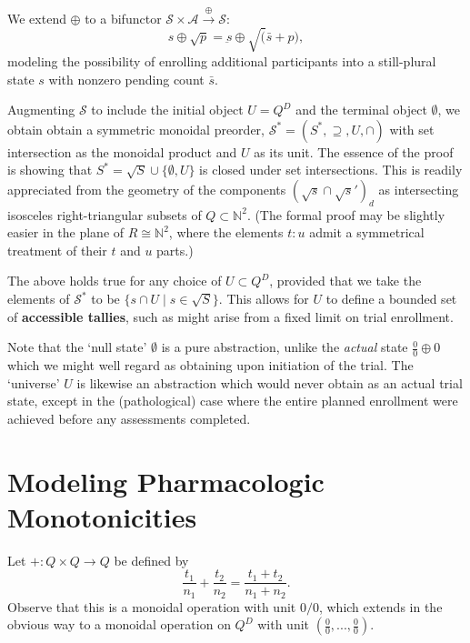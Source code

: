 \documentclass{article}
\newcommand{\N}{\mathbb{N}}
\begin{document}
\begin{nota}
  We extend $\oplus$ to a bifunctor $\mathcal{S} \times \mathcal{A} \xrightarrow{\oplus} \mathcal{S}$:
  $$
  s \oplus \surd p = \underbar{s} \oplus \surd ( \bar{s} + p ),
  $$
  modeling the possibility of enrolling additional participants into a still-plural state $s$ with nonzero pending count $\bar{s}$.
\end{nota}

\begin{fact}
  Augmenting $\mathcal{S}$ to include the initial object $U = Q^D$ and the terminal object $\emptyset$, we obtain obtain a symmetric monoidal preorder, $\mathcal{S}^* = (S^*,\supseteq,U,\cap)$ with set intersection as the monoidal product and $U$ as its unit.  The essence of the proof is showing that $S^* = \surd S \cup \{\emptyset,U\}$ is closed under set intersections.  This is readily appreciated from the geometry of the components $(\surd s \cap \surd s')_d$ as intersecting isosceles right-triangular subsets of $Q \subset \N^2$.  (The formal proof may be slightly easier in the plane of $R \cong \N^2$, where the elements $t\!:\!u$ admit a symmetrical treatment of their $t$ and $u$ parts.)
\end{fact}

\begin{fact}
  The above holds true for any choice of $U \subset Q^D$, provided that we take the elements of $\mathcal{S}^*$ to be $\{s \cap U \mid s \in \surd S\}$.  This allows for $U$ to define a bounded set of \textbf{accessible tallies}, such as might arise from a fixed limit on trial enrollment.
\end{fact}

Note that the `null state' $\emptyset$ is a pure abstraction, unlike the {\em actual} state $\frac{0}{0} \oplus 0$ which we might well regard as obtaining upon initiation of the trial.  The `universe' $U$ is likewise an abstraction which would never obtain as an actual trial state, except in the (pathological) case where the entire planned enrollment were achieved before any assessments completed.

\section{Modeling Pharmacologic Monotonicities}

\begin{defn}
  Let $+:Q \times Q \rightarrow Q$ be defined by
  $$
  \frac{t_1}{n_1} + \frac{t_2}{n_2} = \frac{t_1 + t_2}{n_1 + n_2}.
  $$
  Observe that this is a monoidal operation with unit $0/0$, which extends in the obvious way to a monoidal operation on $Q^D$ with unit $(\frac{0}{0},...,\frac{0}{0})$.
\end{defn}
\end{document}
